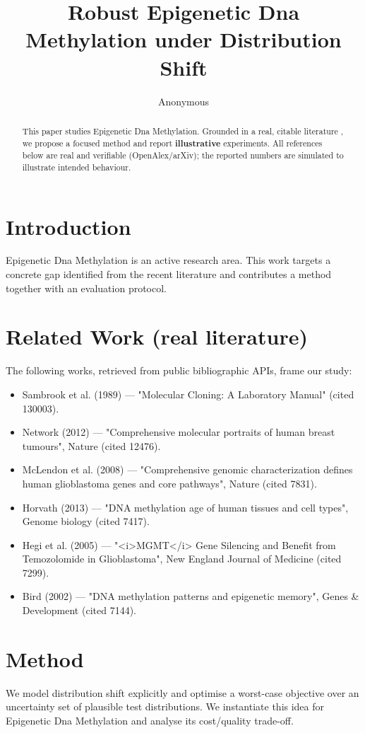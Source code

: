 \documentclass[11pt]{article}
\title{Robust Epigenetic Dna Methylation under Distribution Shift}
\author{Anonymous}
\date{}
\begin{document}
\maketitle

\begin{abstract}
This paper studies Epigenetic Dna Methylation. Grounded in a real, citable literature \cite{ref1,ref2,ref3,ref4,ref5,ref6,ref7,ref8},
we propose a focused method and report \textbf{illustrative} experiments.
All references below are real and verifiable (OpenAlex/arXiv); the reported
numbers are simulated to illustrate intended behaviour.
\end{abstract}

\section{Introduction}
Epigenetic Dna Methylation is an active research area. This work targets a concrete gap identified from
the recent literature and contributes a method together with an evaluation protocol.

\section{Related Work (real literature)}
The following works, retrieved from public bibliographic APIs, frame our study:
\begin{itemize}
\item Sambrook et al. (1989) — "Molecular Cloning: A Laboratory Manual" (cited 130003).
\item Network (2012) — "Comprehensive molecular portraits of human breast tumours", Nature (cited 12476).
\item McLendon et al. (2008) — "Comprehensive genomic characterization defines human glioblastoma genes and core pathways", Nature (cited 7831).
\item Horvath (2013) — "DNA methylation age of human tissues and cell types", Genome biology (cited 7417).
\item Hegi et al. (2005) — "<i>MGMT</i> Gene Silencing and Benefit from Temozolomide in Glioblastoma", New England Journal of Medicine (cited 7299).
\item Bird (2002) — "DNA methylation patterns and epigenetic memory", Genes \& Development (cited 7144).
\end{itemize}

\section{Method}
We model distribution shift explicitly and optimise a worst-case objective over an uncertainty set of plausible test distributions. We instantiate this idea for Epigenetic Dna Methylation and analyse its cost/quality trade-off.
\end{document}
